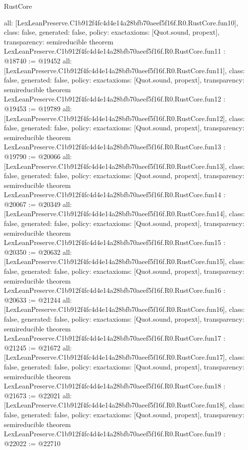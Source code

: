 \begin{lexlean}{RustCore}
\begin{coremodule}
{  all: [LexLeanPreserve.C1b912f4fc4d4e14a28bfb70aeef5f16f.R0.RustCore.fun10],
  class: false,
  generated: false,
  policy: exact{axioms: [Quot.sound, propext]},
  transparency: semireducible
}
theorem LexLeanPreserve.C1b912f4fc4d4e14a28bfb70aeef5f16f.R0.RustCore.fun11 : @18740 := @19452 {
  all: [LexLeanPreserve.C1b912f4fc4d4e14a28bfb70aeef5f16f.R0.RustCore.fun11],
  class: false,
  generated: false,
  policy: exact{axioms: [Quot.sound, propext]},
  transparency: semireducible
}
theorem LexLeanPreserve.C1b912f4fc4d4e14a28bfb70aeef5f16f.R0.RustCore.fun12 : @19453 := @19789 {
  all: [LexLeanPreserve.C1b912f4fc4d4e14a28bfb70aeef5f16f.R0.RustCore.fun12],
  class: false,
  generated: false,
  policy: exact{axioms: [Quot.sound, propext]},
  transparency: semireducible
}
theorem LexLeanPreserve.C1b912f4fc4d4e14a28bfb70aeef5f16f.R0.RustCore.fun13 : @19790 := @20066 {
  all: [LexLeanPreserve.C1b912f4fc4d4e14a28bfb70aeef5f16f.R0.RustCore.fun13],
  class: false,
  generated: false,
  policy: exact{axioms: [Quot.sound, propext]},
  transparency: semireducible
}
theorem LexLeanPreserve.C1b912f4fc4d4e14a28bfb70aeef5f16f.R0.RustCore.fun14 : @20067 := @20349 {
  all: [LexLeanPreserve.C1b912f4fc4d4e14a28bfb70aeef5f16f.R0.RustCore.fun14],
  class: false,
  generated: false,
  policy: exact{axioms: [Quot.sound, propext]},
  transparency: semireducible
}
theorem LexLeanPreserve.C1b912f4fc4d4e14a28bfb70aeef5f16f.R0.RustCore.fun15 : @20350 := @20632 {
  all: [LexLeanPreserve.C1b912f4fc4d4e14a28bfb70aeef5f16f.R0.RustCore.fun15],
  class: false,
  generated: false,
  policy: exact{axioms: [Quot.sound, propext]},
  transparency: semireducible
}
theorem LexLeanPreserve.C1b912f4fc4d4e14a28bfb70aeef5f16f.R0.RustCore.fun16 : @20633 := @21244 {
  all: [LexLeanPreserve.C1b912f4fc4d4e14a28bfb70aeef5f16f.R0.RustCore.fun16],
  class: false,
  generated: false,
  policy: exact{axioms: [Quot.sound, propext]},
  transparency: semireducible
}
theorem LexLeanPreserve.C1b912f4fc4d4e14a28bfb70aeef5f16f.R0.RustCore.fun17 : @21245 := @21672 {
  all: [LexLeanPreserve.C1b912f4fc4d4e14a28bfb70aeef5f16f.R0.RustCore.fun17],
  class: false,
  generated: false,
  policy: exact{axioms: [Quot.sound, propext]},
  transparency: semireducible
}
theorem LexLeanPreserve.C1b912f4fc4d4e14a28bfb70aeef5f16f.R0.RustCore.fun18 : @21673 := @22021 {
  all: [LexLeanPreserve.C1b912f4fc4d4e14a28bfb70aeef5f16f.R0.RustCore.fun18],
  class: false,
  generated: false,
  policy: exact{axioms: [Quot.sound, propext]},
  transparency: semireducible
}
theorem LexLeanPreserve.C1b912f4fc4d4e14a28bfb70aeef5f16f.R0.RustCore.fun19 : @22022 := @22710 {
}
\end{coremodule}
\end{lexlean}
